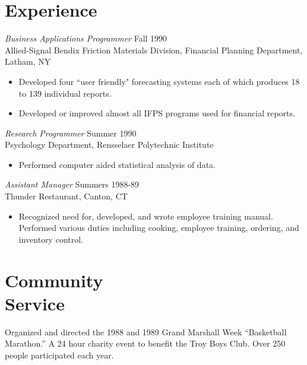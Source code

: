 \documentclass[margin]{résumé}
\begin{document}
\begin{resume}
\section{\sc Experience} {\sl Business Applications Programmer} \hfill Fall 1990 \\
                Allied-Signal Bendix Friction Materials Division, 
                Financial Planning Department, Latham, NY 
                 \begin{itemize}  \itemsep -2pt %
                 \item Developed four ``user friendly" forecasting 
                    systems each of which produces 18 to 139 
                    individual reports. 
                \item   Developed or improved almost all IFPS 
                    programs used for financial reports. 
                \end{itemize}
 
                {\sl Research Programmer} \hfill            Summer 1990 \\
                Psychology Department, Rensselaer Polytechnic 
                Institute 
                 \begin{itemize}  \itemsep -2pt %
                 \item Performed computer aided statistical analysis 
                    of data. 
                 \end{itemize} 
                {\sl Assistant Manager} \hfill        Summers 1988-89 \\
                Thunder Restaurant, Canton, CT
                  \begin{itemize}
                   \item Recognized need for, developed, and wrote 
                    employee training manual. Performed various 
                    duties including cooking, employee training, 
                    ordering, and inventory control. 
                   \end{itemize} 
 
\section{\sc Community \\ Service}  Organized and directed the 1988 and 1989 Grand 
                 Marshall Week \newline ``Basketball Marathon.'' A 24 hour 
                charity event to benefit the Troy Boys Club. Over 
                250 people participated each year. 


\end{resume}
\end{document}

